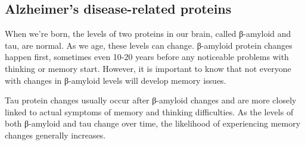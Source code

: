 \subsection{Alzheimer's disease-related proteins}

When we’re born, the levels of two proteins in our brain, called β-amyloid and
tau, are normal. As we age, these levels can change. β-amyloid protein changes
happen first, sometimes even 10-20 years before any noticeable problems with
thinking or memory start. However, it is important to know that not everyone
with changes in β-amyloid levels will develop memory issues.

Tau protein changes usually occur after β-amyloid changes and are more closely
linked to actual symptoms of memory and thinking difficulties. As the levels of
both β-amyloid and tau change over time, the likelihood of experiencing memory
changes generally increases.